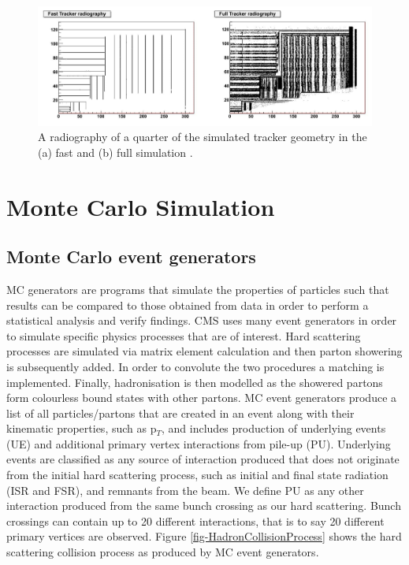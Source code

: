 \begin{figure} \label{fig-FullSim}
\begin{center}
\includegraphics[width=\textwidth]{Figures/FullSim.png}
\caption{A radiography of a quarter of the simulated tracker geometry in the (a) fast and (b) full simulation \cite{1742-6596-513-2-022012}.}
\end{center}
\end{figure}

\section{Monte Carlo Simulation}

\subsection{Monte Carlo event generators} \label{subsec-MCEventGenerators}

MC generators are programs that simulate the properties of particles such that results can be compared to those obtained from data in order to perform a statistical analysis and verify findings. CMS uses many event generators in order to simulate specific physics processes that are of interest. Hard scattering processes are simulated via matrix element calculation and then parton showering is subsequently added. In order to convolute the two procedures a matching is implemented. Finally, hadronisation is then modelled as the showered partons form colourless bound states with other partons. MC event generators produce a list of all particles/partons that are created in an event along with their kinematic properties, such as p$_T$, and includes production of underlying events (UE) and additional primary vertex interactions from pile-up (PU). Underlying events are classified as any source of interaction produced that does not originate from the initial hard scattering process, such as initial and final state radiation (ISR and FSR), and remnants from the beam. We define PU as any other interaction produced from the same bunch crossing as our hard scattering. Bunch crossings can contain up to 20 different interactions, that is to say 20 different primary vertices are observed. Figure \ref{fig-HadronCollisionProcess} shows the hard scattering collision process as produced by MC event generators. 

